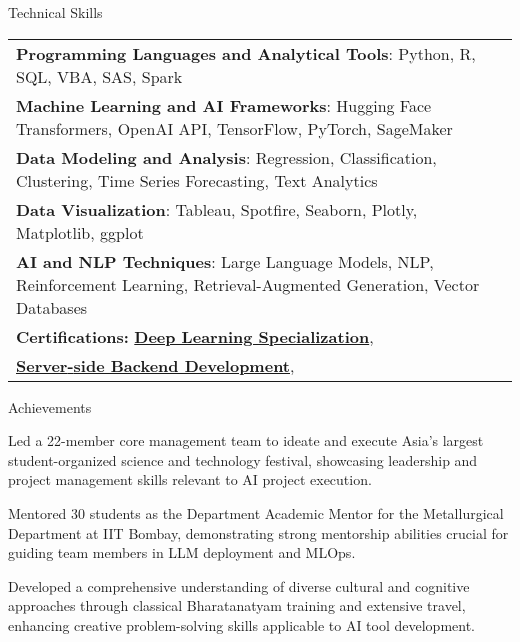 \documentclass{resume} %
\begin{document}
    \begin{rSection}{Technical Skills}
        \begin{tabular}{ @{} l @{\hspace{1ex}} l }
                                \textbf{Programming Languages and Analytical Tools}: Python, R, SQL, VBA, SAS, Spark\\
                                \textbf{Machine Learning and AI Frameworks}: Hugging Face Transformers, OpenAI API, TensorFlow, PyTorch, SageMaker\\
                                \textbf{Data Modeling and Analysis}: Regression, Classification, Clustering, Time Series Forecasting, Text Analytics\\
                                \textbf{Data Visualization}: Tableau, Spotfire, Seaborn, Plotly, Matplotlib, ggplot\\
                                \textbf{AI and NLP Techniques}: Large Language Models, NLP, Reinforcement Learning, Retrieval{-}Augmented Generation, Vector Databases\\
                        \textbf{Certifications:} 
                                            \href{https://www.coursera.org/account/accomplishments/specialization/G3WPNWRYX628}{\textbf{Deep Learning Specialization}},\\
                                            \href{https://www.coursera.org/account/accomplishments/verify/TYMQX23D4HRQ}{\textbf{Server{-}side Backend Development}},\\
                                 
        \end{tabular}
    \end{rSection}
 

    \begin{rSection}{Achievements}
        \begin{rSubsection}{}{}{}
                            \item Led a 22{-}member core management team to ideate and execute Asia's largest student{-}organized science and technology festival, showcasing leadership and project management skills relevant to AI project execution.
                            \item Mentored 30 students as the Department Academic Mentor for the Metallurgical Department at IIT Bombay, demonstrating strong mentorship abilities crucial for guiding team members in LLM deployment and MLOps.
                            \item Developed a comprehensive understanding of diverse cultural and cognitive approaches through classical Bharatanatyam training and extensive travel, enhancing creative problem{-}solving skills applicable to AI tool development.
                    \end{rSubsection}
    \end{rSection}
\end{document}
